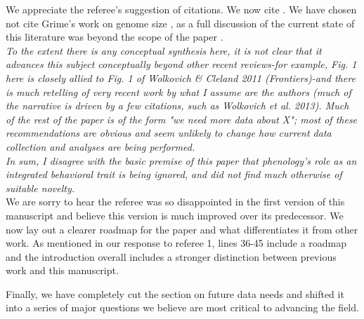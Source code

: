 \documentclass[11pt,a4paper]{letter}
\begin{document}
\begin{letter}{}
We appreciate the referee's suggestion of citations. We now cite \cite{Almufti1977}. We have chosen not cite Grime's work on genome size \citep{Grime:1982xv}, as a full discussion of the current state of this literature was beyond the scope of the paper \citep[for example, see][]{Bennett1995,gregory2001}.\\

\emph{To the extent there is any conceptual synthesis here, it is not clear that it advances this subject conceptually beyond other recent reviews-for example, Fig. 1 here is closely allied to Fig. 1 of Wolkovich \& Cleland 2011 (Frontiers)-and there is much retelling of very recent work by what I assume are the authors (much of the narrative is driven by a few citations, such as Wolkovich et al. 2013). Much of the rest of the paper is of the form "we need more data about X"; most of these recommendations are obvious and seem unlikely to change how current data collection and analyses are being performed. \\ In sum, I disagree with the basic premise of this paper that phenology's role as an integrated behavioral trait is being ignored, and did not find much otherwise of suitable novelty. }\\

We are sorry to hear the referee was so disappointed in the first version of this manuscript and believe this version is much improved over its predecessor. We now lay out a clearer roadmap for the paper and what differentiates it from other work. As mentioned in our response to referee 1, lines 36-45 include a roadmap and the introduction overall includes a stronger distinction between previous work and this manuscript.

Finally, we have completely cut the section on future data needs and shifted it into a series of major questions we believe are most critical to advancing the field.

\newpage


\end{letter}
\end{document}
